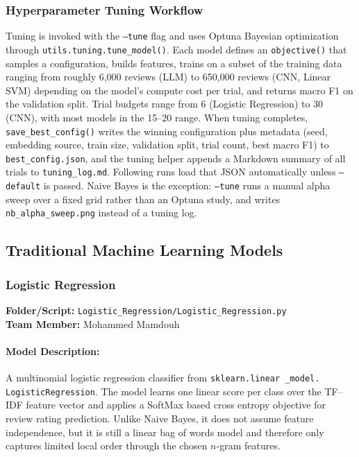 \documentclass[12pt]{article}
\begin{document}
\subsubsection{Hyperparameter Tuning Workflow}

Tuning is invoked with the \texttt{--tune} flag and uses Optuna Bayesian optimization through \texttt{utils.tuning.tune\_model()}. Each model defines an \texttt{objective()} that samples a configuration, builds features, trains on a subset of the training data ranging from roughly 6,000 reviews (LLM) to 650,000 reviews (CNN, Linear SVM) depending on the model's compute cost per trial, and returns macro F1 on the validation split. Trial budgets range from 6 (Logistic Regression) to 30 (CNN), with most models in the 15--20 range. When tuning completes, \texttt{save\_best\_config()} writes the winning configuration plus metadata (seed, embedding source, train size, validation split, trial count, best macro F1) to \texttt{best\_config.json}, and the tuning helper appends a Markdown summary of all trials to \texttt{tuning\_log.md}. Following runs load that JSON automatically unless \texttt{--default} is passed. Naive Bayes is the exception: \texttt{--tune} runs a manual alpha sweep over a fixed grid rather than an Optuna study, and writes \texttt{nb\_alpha\_sweep.png} instead of a tuning log.

\subsection{Traditional Machine Learning Models}

\subsubsection{Logistic Regression}
\textbf{Folder/Script:} \texttt{Logistic\_Regression/Logistic\_Regression.py}\\
\textbf{Team Member:} Mohammed Mamdouh

\paragraph{Model Description:}\mbox{}
A multinomial logistic regression classifier from \texttt{sklearn.linear \_model. LogisticRegression}. The model learns one linear score per class over the TF--IDF feature vector and applies a SoftMax based cross entropy objective for review rating prediction. Unlike Naive Bayes, it does not assume feature independence, but it is still a linear bag of words model and therefore only captures limited local order through the chosen $n$-gram features.
\end{document}
